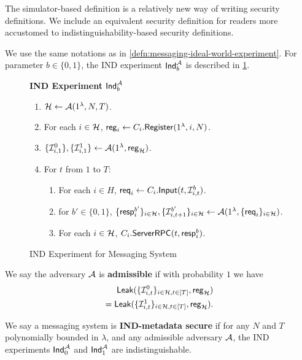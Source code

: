 The simulator-based definition is a relatively new way of writing security definitions. We include an equivalent security definition for readers more accustomed to indistinguishability-based security definitions.
\begin{definition}
\label{defn:messaging-ind-experiment}
We use the same notations as in \cref{defn:messaging-ideal-world-experiment}. For parameter $b \in \{0, 1\}$, the IND experiment $\mathsf{Ind}_b^{\mathcal{A}}$ is described in \cref{expr:messaging-IND}.

\begin{figure}[!h]
\begin{framed}
\textbf{IND Experiment} $\mathsf{Ind}_b^{\mathcal{A}}$
\begin{enumerate}
\item $\mathcal{H} \leftarrow \mathcal{A}(1^{\lambda}, N, T)$.
\item For each $i \in \mathcal{H}$, $\mathsf{reg}_i \leftarrow C_i.\mathsf{Register}(1^{\lambda}, i, N)$. 
\item $\{\mathcal{I}^{0}_{i, 1}\}, \{\mathcal{I}^{1}_{i, 1}\} \leftarrow \mathcal{A}(1^{\lambda}, \mathsf{reg}_{\mathcal{H}})$.
\item For $t$ from $1$ to $T$:
    \begin{enumerate}
    \item For each $i \in H$, $\mathsf{req}_i \leftarrow C_i.\mathsf{Input}(t, \mathcal{I}^{b}_{i, t})$.
    
    \item for $b'\in \{0, 1\}$, $\{\mathsf{resp}^{b'}_i\}_{i \in \mathcal{H}},\{\mathcal{I}^{b'}_{i, t + 1}\}_{i \in \mathcal{H}} \leftarrow \mathcal{A}(1^{\lambda}, \{\mathsf{req}_i\}_{i \in \mathcal{H}})$.
    
    \item For each $i \in \mathcal{H}$, $C_i.\mathsf{ServerRPC}(t, \mathsf{resp}^{b}_i)$.
    \end{enumerate}
\end{enumerate}
\end{framed}
\caption{IND Experiment for Messaging System}
\label{expr:messaging-IND}
\end{figure}

We say the adversary $\mathcal{A}$ is \textbf{admissible} if with probability $1$ we have
\begin{align*}
\mathsf{Leak}(\{\mathcal{I}^{0}_{i, t}\}_{i \in \mathcal{H}, t \in [T]}, \mathsf{reg}_{\mathcal{H}}) \\
= \mathsf{Leak}(\{\mathcal{I}^{1}_{i, t}\}_{i \in \mathcal{H}, t \in [T]}, \mathsf{reg}_{\mathcal{H}}).    
\end{align*}
\end{definition}
\begin{definition}
\label{defn:messaging-IND-security}
We say a messaging system is \textbf{IND-metadata secure} if for any $N$ and $T$ polynomially bounded in $\lambda$, and any admissible adversary $\mathcal{A}$, the IND experiments $\mathsf{Ind}_0^{\mathcal{A}}$ and $\mathsf{Ind}_1^{\mathcal{A}}$ are indistinguishable.
\end{definition}

